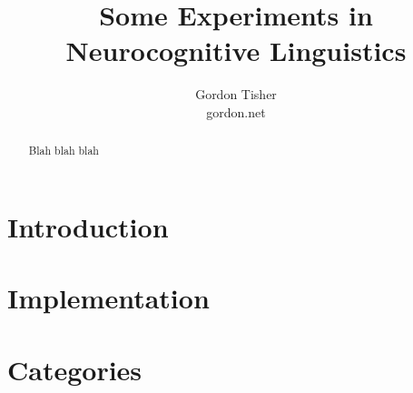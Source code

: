 \documentclass[12pt,letterpaper,twocolumn]{article}
\begin{document}
\author{Gordon Tisher\\gordon\@balafon.net}
\title{Some Experiments in Neurocognitive Linguistics}
\maketitle

\begin{abstract}
Blah blah blah
\end{abstract}


\section{Introduction}




\section{Implementation}





\section{Categories}







\end{document}
